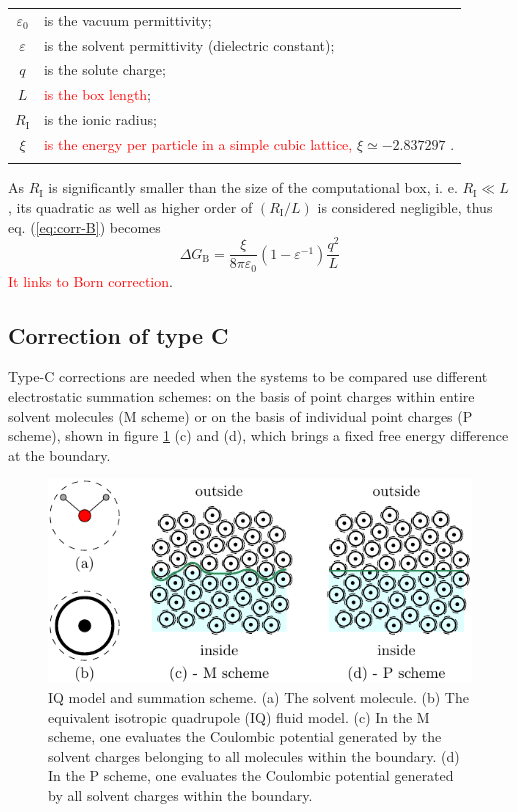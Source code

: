 \begin{tabular}{cl}
 $\varepsilon_{0}$ & is the vacuum permittivity;\tabularnewline
$\varepsilon$ & is the solvent permittivity (dielectric constant);\tabularnewline
$q$ & is the solute charge;\tabularnewline
$L$ & \textcolor{red}{is the box length};\tabularnewline
$R_{\mathrm{I}}$ & is the ionic radius;\tabularnewline
$\xi$ & \textcolor{red}{is the energy per particle in a simple cubic lattice,}
$\xi\simeq-2.837297$ \citep{nijboer}.\tabularnewline
 & \tabularnewline
\end{tabular} 

As $R_{\mathrm{I}}$ is significantly smaller than the size of the
computational box, i. e. $R_{\mathrm{I}}\ll L$, its quadratic as
well as higher order of $\left(R_{\mathrm{I}}/L\right)$ is considered
negligible, thus eq. (\ref{eq:corr-B}) becomes
\begin{equation}
\Delta G_{\mathrm{B}}=\frac{\xi}{8\pi\varepsilon_{0}}\left(1-\varepsilon^{-1}\right)\frac{q^{2}}{L}
\end{equation}
\textcolor{red}{It links to Born correction}.

\subsection{Correction of type C}

Type-C corrections are needed when the systems to be compared use
different electrostatic summation schemes: on the basis of point charges
within entire solvent molecules (M scheme) or on the basis of individual
point charges (P scheme), shown in figure \ref{fig:IQ-model-som-scheme}
(c) and (d), which brings a fixed free energy difference at the boundary.

\begin{figure}[h]
\begin{centering}
\includegraphics{_figure/ion_correction}
\par\end{centering}
\caption[IQ model and summation scheme]{IQ model and summation scheme. (a) The solvent molecule. (b) The
equivalent isotropic quadrupole (IQ) fluid model. (c) In the M scheme,
one evaluates the Coulombic potential generated by the solvent charges
belonging to all molecules within the boundary. (d) In the P scheme,
one evaluates the Coulombic potential generated by all solvent charges
within the boundary.\label{fig:IQ-model-som-scheme}}
\end{figure}

